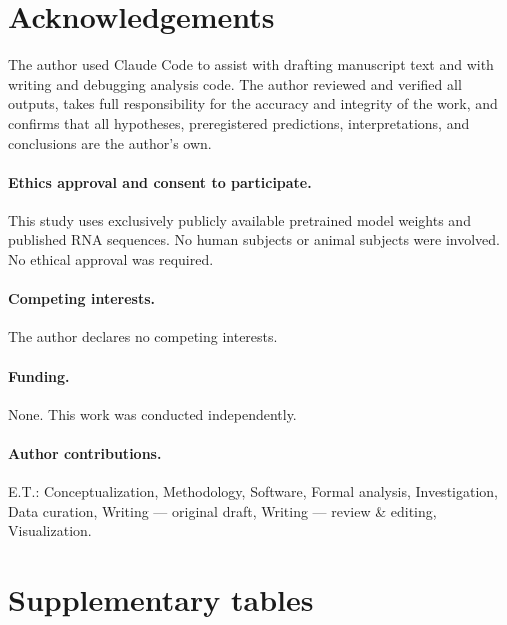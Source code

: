 \documentclass[11pt]{article}
\begin{document}
\section*{Acknowledgements}

The author used Claude Code \citep{anthropic2025claude} to assist with
drafting manuscript text and with writing and debugging analysis code.
The author reviewed and verified all outputs, takes full responsibility
for the accuracy and integrity of the work, and confirms that all
hypotheses, preregistered predictions, interpretations, and conclusions
are the author's own.

\paragraph{Ethics approval and consent to participate.}
This study uses exclusively publicly available pretrained model weights
and published RNA sequences. No human subjects or animal subjects were
involved. No ethical approval was required.

\paragraph{Competing interests.} The author declares no competing interests.

\paragraph{Funding.} None. This work was conducted independently.

\paragraph{Author contributions.} E.T.: Conceptualization, Methodology,
Software, Formal analysis, Investigation, Data curation, Writing ---
original draft, Writing --- review \& editing, Visualization.


\appendix
\section{Supplementary tables}
\label{app:supplement}













\end{document}
